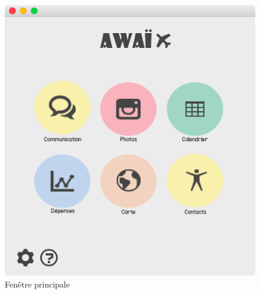 \documentclass[11pt]{article}
\begin{document}
\begin{figure}[hbtp]
\begin{minipage}[b]{0.48\linewidth}
        \centering \includegraphics[scale=0.43]{Modelisation/awai.png}
       \caption{Fenêtre principale}
\label{fig:principale}
    \end{minipage}
\end{figure}
\end{document}
